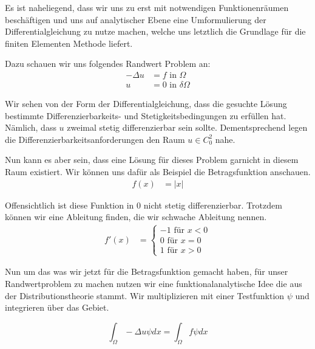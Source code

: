 Es ist naheliegend, dass wir uns zu erst mit notwendigen Funktionenräumen beschäftigen und uns auf analytischer Ebene eine Umformulierung der Differentialgleichung zu nutze machen, welche uns letztlich die Grundlage für die finiten Elementen Methode liefert.

Dazu schauen wir uns folgendes Randwert Problem an:
\begin{equation} \label{eq:dg}
\begin{aligned}
	- \Delta u &= f \text{ in } \Omega \\
	u &= 0 \text{ in } \delta \Omega	
\end{aligned}
\end{equation}

Wir sehen von der Form der Differentialgleichung, dass die gesuchte Lösung bestimmte Differenzierbarkeits- und Stetigkeitsbedingungen zu erfüllen hat. Nämlich, dass $u$ zweimal stetig differenzierbar sein sollte.
Dementsprechend legen die Differenzierbarkeitsanforderungen den Raum $u \in C_{0}^{2}$ nahe.

Nun kann es aber sein, dass eine Lösung für dieses Problem garnicht in diesem Raum existiert. Wir können uns dafür als Beispiel die Betragsfunktion anschauen.
\begin{equation}
\begin{aligned}
f(x) &= | x |
\end{aligned}
\end{equation}

Offensichtlich ist diese Funktion in 0 nicht stetig differenzierbar. Trotzdem können wir eine Ableitung finden, die wir schwache Ableitung nennen. 
\begin{equation}
\begin{aligned}
f'(x) &= 
\begin{cases}
-1 \text{ für } x < 0 \\
0 \text{ für } x = 0  \\
1 \text{ für } x > 0 
\end{cases}
\end{aligned}
\end{equation}

Nun um das was wir jetzt für die Betragsfunktion gemacht haben, für unser Randwertproblem zu machen nutzen wir eine funktionalanalytische Idee die aus der Distributionstheorie stammt.
Wir multiplizieren mit einer Testfunktion $\psi$  und integrieren über das Gebiet.

\begin{equation}
\label{eq:sf1}
\int_{\Omega} - \Delta u \psi dx = \int_{\Omega} f \psi dx
\end{equation}

